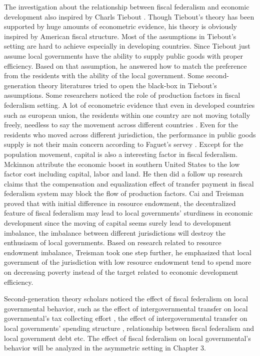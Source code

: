 The investigation about the relationship between fiscal federalism and economic development also inspired by Charls Tiebout \cite{tiebout1956pure}. Though Tiebout's theory has been supported by huge amounts of econometric evidence, his theory is obviously inspired by American fiscal structure. Most of the assumptions in Tiebout's setting are hard to achieve especially in developing countries. Since Tiebout just assume local governments have the ability to supply public goods with proper efficiency. Based on that assumption, he answered how to match the preference from the residents with the ability of the local government. Some second-generation theory literatures tried to open the black-box in Tiebout's assumptions. Some researchers noticed the role of production factors in fiscal federalism setting. A lot of econometric evidence that even in developed countries such as european union, the residents within one country are not moving totally freely, needless to say the movement across different countries \cite{oates2004essay}. Even for the residents who moved across different jurisdiction, the performance in public goods supply is not their main concern according to Faguet's servey \cite{faguet2004does}. Except for the population movement, capital is also a interesting factor in fiscal federalism. Mckinnon \cite{mckinnon1993order} attribute the economic boost in southern United States to the low factor cost including capital, labor and land. He then did a follow up research claims that the compensation and equalization effect of transfer payment in fiscal federalism system may block the flow of production factors. Cai and Treisman \cite{cai2005does} proved that with initial difference in resource endowment, the decentralized feature of fiscal federalism may lead to local governments' sturdiness in economic development since the moving of capital seems surely lead to development imbalance, the imbalance between different jurisdictions will destroy the enthusiasm of local governments. Based on research related to resource endowment imbalance, Treisman \cite{treisman2002decentralization} took one step further, he emphasized that local government of the jurisdiction with low resource endowment tend to spend more on decreasing poverty instead of the target related to economic development efficiency.

Second-generation theory scholars noticed the effect of fiscal federalism on local governmental behavior, such as the effect of intergovernmental transfer on local governmental's tax collecting effort \cite{mogues2012external}, the effect of intergovernmental transfer on local governments' spending structure \cite{hines1995anomalies}, relationship between fiscal federalism and local government debt \cite{qian1998federalism} etc. The effect of fiscal federalism on local governmental's behavior will be analyzed in the asymmetric setting in Chapter 3.

